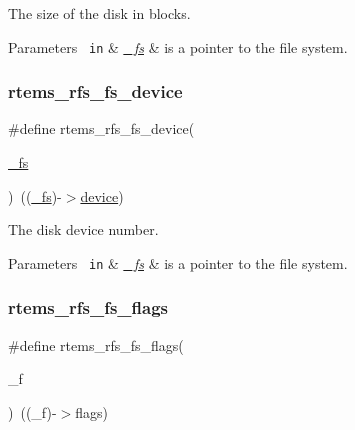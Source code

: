 The size of the disk in blocks.


\begin{DoxyParams}[1]{Parameters}
\mbox{\texttt{ in}}  & {\em \mbox{\hyperlink{struct__fs}{\+\_\+fs}}} & is a pointer to the file system. \\
\hline
\end{DoxyParams}
\mbox{\label{rtems-rfs-file-system_8h_a695fd90ac521035644782df512e5b9ba}} 
\subsubsection{\texorpdfstring{rtems\_rfs\_fs\_device}{rtems\_rfs\_fs\_device}}
{\footnotesize\ttfamily \#define rtems\+\_\+rfs\+\_\+fs\+\_\+device(\begin{DoxyParamCaption}\item[{}]{\mbox{\hyperlink{struct__fs}{\+\_\+fs}} }\end{DoxyParamCaption})~((\mbox{\hyperlink{struct__fs}{\+\_\+fs}})-\/$>$\mbox{\hyperlink{structdevice}{device}})}

The disk device number.


\begin{DoxyParams}[1]{Parameters}
\mbox{\texttt{ in}}  & {\em \mbox{\hyperlink{struct__fs}{\+\_\+fs}}} & is a pointer to the file system. \\
\hline
\end{DoxyParams}
\mbox{\label{rtems-rfs-file-system_8h_a9c000723c938133e303de702c51564e0}} 
\subsubsection{\texorpdfstring{rtems\_rfs\_fs\_flags}{rtems\_rfs\_fs\_flags}}
{\footnotesize\ttfamily \#define rtems\+\_\+rfs\+\_\+fs\+\_\+flags(\begin{DoxyParamCaption}\item[{}]{\+\_\+f }\end{DoxyParamCaption})~((\+\_\+f)-\/$>$flags)}

